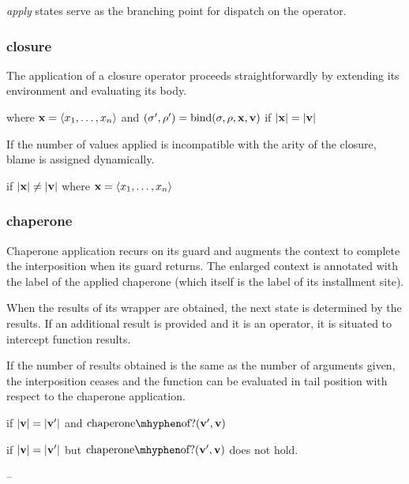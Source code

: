 \documentclass{sigplanconf}
\begin{document}
\emph{apply} states serve as the branching point for dispatch on the operator.

\subsubsection{closure}

The application of a closure operator proceeds straightforwardly by extending its environment and evaluating its body.

where $\mathbf{x}=\langle x_1,\dots,x_n\rangle$ and $(\sigma',\rho')=\mathrm{bind}(\sigma,\rho,\mathbf{x},\mathbf{v})$ if $|\mathbf{x}|=|\mathbf{v}|$

If the number of values applied is incompatible with the arity of the closure, blame is assigned dynamically.

if $|\mathbf{x}|\ne|\mathbf{v}|$ where $\mathbf{x}=\langle x_1,\dots,x_n\rangle$

\subsubsection{chaperone}

Chaperone application recurs on its guard and augments the context to complete the interposition when its guard returns.
The enlarged context is annotated with the label of the applied chaperone (which itself is the label of its installment site).


When the results of its wrapper are obtained, the next state is determined by the results.
If an additional result is provided and it is an operator, it is situated to intercept function results.

If the number of results obtained is the same as the number of arguments given, the interposition ceases and the function can be evaluated in tail position with respect to the chaperone application.

if $|\mathbf{v}|=|\mathbf{v'}|$ and $\mathrm{chaperone\mhyphen of?}(\vvp,\vv)$

if $|\mathbf{v}|=|\mathbf{v'}|$ but $\mathrm{chaperone\mhyphen of?}(\vvp,\vv)$ does not hold.

--
\end{document}
